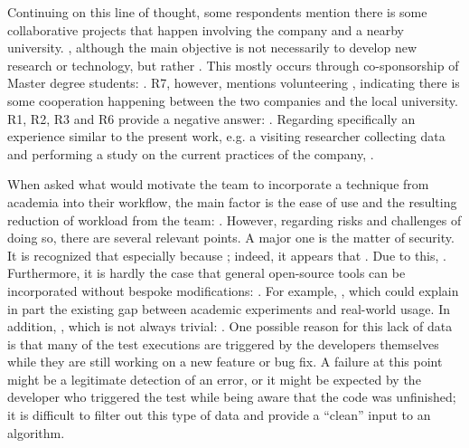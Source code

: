 Continuing on this line of thought, some respondents mention there is some collaborative projects that happen involving the company and a nearby university.
, although the main objective is not necessarily to develop new research or technology, but rather .
This mostly occurs through co-sponsorship of Master degree students: .
R7, however, mentions volunteering , indicating there is some cooperation happening between the two companies and the local university.
R1, R2, R3 and R6 provide a negative answer: .
Regarding specifically an experience similar to the present work, e.g. a visiting researcher collecting data and performing a study on the current practices of the company, .

When asked what would motivate the team to incorporate a technique from academia into their workflow, the main factor is the ease of use and the resulting reduction of workload from the team: .
However, regarding risks and challenges of doing so, there are several relevant points.
A major one is the matter of security.
It is recognized that  especially because ; indeed, it appears that .
Due to this, .
Furthermore, it is hardly the case that general open-source tools can be incorporated without bespoke modifications: .
For example, , which could explain in part the existing gap between academic experiments and real-world usage.
In addition, , which is not always trivial: .
One possible reason for this lack of data is that many of the test executions are triggered by the developers themselves while they are still working on a new feature or bug fix. 
A failure at this point might be a legitimate detection of an error, or it might be expected by the developer who triggered the test while being aware that the code was unfinished; it is difficult to filter out this type of data and provide a ``clean'' input to an algorithm.

